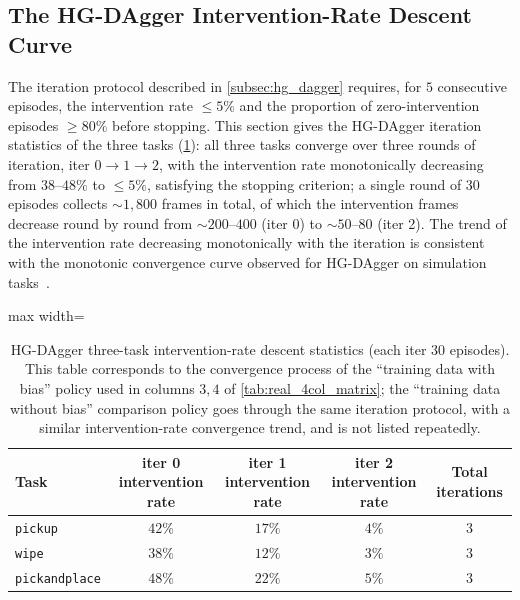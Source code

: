 \subsection{The HG-DAgger Intervention-Rate Descent Curve}\label{subsec:exp_dagger_curve}

The iteration protocol described in \cref{subsec:hg_dagger} requires, for $5$ consecutive episodes, the intervention rate $\le 5\%$ and the proportion of zero-intervention episodes $\ge 80\%$ before stopping. This section gives the HG-DAgger iteration statistics of the three tasks (\cref{tab:dagger_iter_stats}): all three tasks converge over three rounds of iteration, iter $0\to 1\to 2$, with the intervention rate monotonically decreasing from $38$--$48\%$ to $\le 5\%$, satisfying the stopping criterion; a single round of $30$ episodes collects $\sim 1{,}800$ frames in total, of which the intervention frames decrease round by round from $\sim 200$--$400$ (iter 0) to $\sim 50$--$80$ (iter 2). The trend of the intervention rate decreasing monotonically with the iteration is consistent with the monotonic convergence curve observed for HG-DAgger on simulation tasks~\cite{kelly2019hgdagger}.

\begin{table}[htbp]
  \centering
  \caption{HG-DAgger three-task intervention-rate descent statistics (each iter $30$ episodes). This table corresponds to the convergence process of the ``training data with bias'' policy used in columns $3,4$ of \cref{tab:real_4col_matrix}; the ``training data without bias'' comparison policy goes through the same iteration protocol, with a similar intervention-rate convergence trend, and is not listed repeatedly.}
  \label{tab:dagger_iter_stats}
  \footnotesize
  \begin{adjustbox}{max width=\textwidth}
  \begin{tabular}{@{}lcccc@{}}
    \toprule
    Task & iter 0 intervention rate & iter 1 intervention rate & iter 2 intervention rate & Total iterations \\
    \midrule
    \texttt{pickup}        & $42\%$ & $17\%$ & $4\%$  & $3$ \\
    \texttt{wipe}          & $38\%$ & $12\%$ & $3\%$  & $3$ \\
    \texttt{pickandplace}  & $48\%$ & $22\%$ & $5\%$  & $3$ \\
    \bottomrule
  \end{tabular}
  \end{adjustbox}
\end{table}

